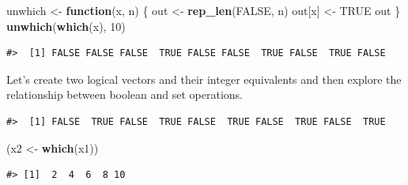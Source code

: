 \documentclass[]{book}
\newenvironment{Shaded}{\begin{snugshade}}{\end{snugshade}}
\newcommand{\KeywordTok}[1]{\textcolor[rgb]{0.13,0.29,0.53}{\textbf{#1}}}
\newcommand{\DecValTok}[1]{\textcolor[rgb]{0.00,0.00,0.81}{#1}}
\newcommand{\StringTok}[1]{\textcolor[rgb]{0.31,0.60,0.02}{#1}}
\newcommand{\OtherTok}[1]{\textcolor[rgb]{0.56,0.35,0.01}{#1}}
\newcommand{\ControlFlowTok}[1]{\textcolor[rgb]{0.13,0.29,0.53}{\textbf{#1}}}
\newcommand{\OperatorTok}[1]{\textcolor[rgb]{0.81,0.36,0.00}{\textbf{#1}}}
\newcommand{\NormalTok}[1]{#1}
\theoremstyle{definition}
\theoremstyle{definition}
\theoremstyle{definition}
\theoremstyle{remark}
\begin{document}
\begin{Shaded}
\begin{Highlighting}[]
\NormalTok{unwhich <-}\StringTok{ }\ControlFlowTok{function}\NormalTok{(x, n) \{}
\NormalTok{  out <-}\StringTok{ }\KeywordTok{rep_len}\NormalTok{(}\OtherTok{FALSE}\NormalTok{, n)}
\NormalTok{  out[x] <-}\StringTok{ }\OtherTok{TRUE}
\NormalTok{  out}
\NormalTok{\}}
\KeywordTok{unwhich}\NormalTok{(}\KeywordTok{which}\NormalTok{(x), }\DecValTok{10}\NormalTok{)}
\end{Highlighting}
\end{Shaded}

\begin{verbatim}
#>  [1] FALSE FALSE FALSE  TRUE FALSE FALSE  TRUE FALSE  TRUE FALSE
\end{verbatim}

Let's create two logical vectors and their integer equivalents and then
explore the relationship between boolean and set operations.

\begin{Shaded}
\end{Shaded}

\begin{verbatim}
#>  [1] FALSE  TRUE FALSE  TRUE FALSE  TRUE FALSE  TRUE FALSE  TRUE
\end{verbatim}

\begin{Shaded}
\begin{Highlighting}[]
\NormalTok{(x2 <-}\StringTok{ }\KeywordTok{which}\NormalTok{(x1))}
\end{Highlighting}
\end{Shaded}

\begin{verbatim}
#> [1]  2  4  6  8 10
\end{verbatim}

\begin{Shaded}
\end{Shaded}
\end{document}
